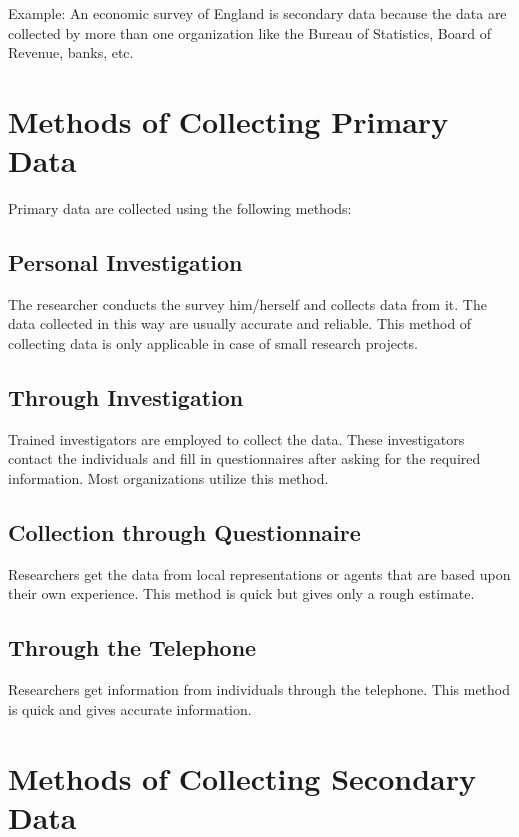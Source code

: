 \documentclass[
]{book}
\begin{document}
Example: An economic survey of England is secondary data because the
data are collected by more than one organization like the Bureau of
Statistics, Board of Revenue, banks, etc.

\section{Methods of Collecting Primary Data}\label{methods-of-collecting-primary-data}

Primary data are collected using the following methods:

\subsection{Personal Investigation}\label{personal-investigation}

The researcher conducts the survey him/herself and collects data from
it. The data collected in this way are usually accurate and reliable.
This method of collecting data is only applicable in case of small
research projects.

\subsection{Through Investigation}\label{through-investigation}

Trained investigators are employed to collect the data. These
investigators contact the individuals and fill in questionnaires after
asking for the required information. Most organizations utilize this
method.

\subsection{Collection through Questionnaire}\label{collection-through-questionnaire}

Researchers get the data from local representations or agents that are
based upon their own experience. This method is quick but gives only a
rough estimate.

\subsection{Through the Telephone}\label{through-the-telephone}

Researchers get information from individuals through the telephone. This
method is quick and gives accurate information.

\section{Methods of Collecting Secondary Data}\label{methods-of-collecting-secondary-data}
\end{document}
